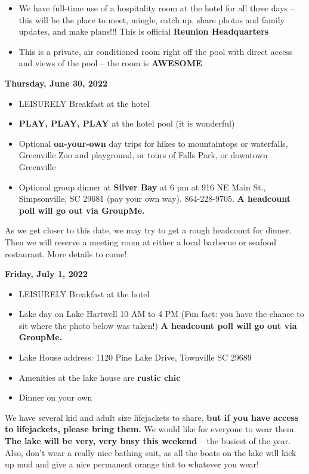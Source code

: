 \documentclass[
]{book}
\providecommand{\tightlist}{%
  \setlength{\itemsep}{0pt}\setlength{\parskip}{0pt}}
\begin{document}
\begin{itemize}
\tightlist
\item
  We have full-time use of a hospitality room at the hotel for all three days -- this will be the place to meet, mingle, catch up, share photos and family updates, and make plans!!! This is official \textbf{Reunion Headquarters}
\item
  This is a private, air conditioned room right off the pool with direct access and views of the pool -- the room is \textbf{AWESOME}
\end{itemize}

\textbf{Thursday, June 30, 2022}

\begin{itemize}
\tightlist
\item
  LEISURELY Breakfast at the hotel
\item
  \textbf{PLAY, PLAY, PLAY} at the hotel pool (it is wonderful)
\item
  Optional \textbf{on-your-own} day trips for hikes to mountaintops or waterfalls, Greenville Zoo and playground, or tours of Falls Park, or downtown Greenville
\item
  Optional group dinner at \textbf{Silver Bay} at 6 pm at 916 NE Main St., Simpsonville, SC 29681 (pay your own way). 864-228-9705. \textbf{A headcount poll will go out via GroupMe.}
\end{itemize}

As we get closer to this date, we may try to get a rough headcount for dinner. Then we will reserve a meeting room at either a local barbecue or seafood restaurant. More details to come!

\textbf{Friday, July 1, 2022}

\begin{itemize}
\tightlist
\item
  LEISURELY Breakfast at the hotel
\item
  Lake day on Lake Hartwell 10 AM to 4 PM (Fun fact: you have the chance to sit where the photo below was taken!) \textbf{A headcount poll will go out via GroupMe.}
\item
  Lake House address: 1120 Pine Lake Drive, Townville SC 29689
\item
  Amenities at the lake house are \textbf{rustic chic}
\item
  Dinner on your own
\end{itemize}

We have several kid and adult size lifejackets to share, \textbf{but if you have access to lifejackets, please bring them.} We would like for everyone to wear them. \textbf{The lake will be very, very busy this weekend} -- the busiest of the year. Also, don't wear a really nice bathing suit, as all the boats on the lake will kick up mud and give a nice permanent orange tint to whatever you wear!
\end{document}
